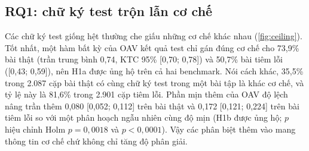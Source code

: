 \documentclass[a4paper,preprint,12pt,authoryear]{elsarticle}
\begin{document}
\begin{table}[t]
\centering
\caption{Các giả thuyết đã đăng ký: chênh lệch trung bình trên các cohort, khoảng bootstrap 95\% và kết luận (H1a báo cáo chính trần trung bình theo kết quả test). H2 và H3 được báo cáo cho K-means và HAC.}\label{tab:hyp}
\small
{}
\end{table}

\subsection{RQ1: chữ ký test trộn lẫn cơ chế}
Các chữ ký test giống hệt thường che giấu những cơ chế khác nhau (\cref{fig:ceiling}). Tốt nhất, một hàm bất kỳ của OAV kết quả test chỉ gán đúng cơ chế cho 73,9\% bài thật (trần trung bình 0,74, KTC 95\% [0,70; 0,78]) và 50,7\% bài tiêm lỗi ([0,43; 0,59]), nên H1a được ủng hộ trên cả hai benchmark. Nói cách khác, 35,5\% trong 2.087 cặp bài thật có cùng chữ ký test trong một bài tập là khác cơ chế, và tỷ lệ này là 81,6\% trong 2.901 cặp tiêm lỗi. Phần mịn thêm của OAV độ lệch nâng trần thêm 0,080 [0,052; 0,112] trên bài thật và 0,172 [0,121; 0,224] trên bài tiêm lỗi so với một phân hoạch ngẫu nhiên cùng độ mịn (H1b được ủng hộ; $p$ hiệu chỉnh Holm $p = 0,0018$ và $p < 0,0001$). Vậy các phân biệt thêm vào mang thông tin cơ chế chứ không chỉ tăng độ phân giải.
\end{document}
